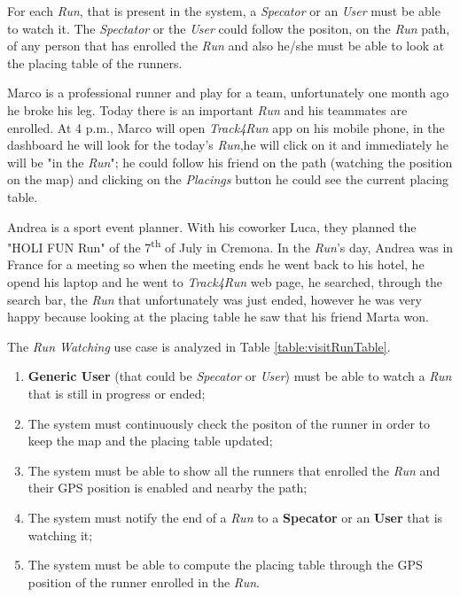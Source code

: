 For each \textit{Run}, that is present in the system, a \textit{Specator} or an \textit{User} must be able to watch it.
The \textit{Spectator} or the \textit{User} could follow the positon, on the \textit{Run} path, of any person that has enrolled the \textit{Run} and also he/she must be able to look at the placing table of the runners.

Marco is a professional runner and play for a team, unfortunately one month ago he broke his leg. Today there is an important \textit{Run} and his teammates are enrolled. At 4 p.m., Marco will open \textit{Track4Run} app on his mobile phone, in the dashboard he will look for the today's \textit{Run},he will click on it and immediately he will be "in the \textit{Run}";
he could follow his friend on the path (watching the position on the map) and clicking on the \textit{Placings} button he could see the current placing table.

Andrea is a sport event planner. With his coworker Luca, they planned the "HOLI FUN Run" of the 7\textsuperscript{th} of July in Cremona. In the \textit{Run}'s day, Andrea was in France for a meeting so when the meeting ends he went back to his hotel, he opend his laptop and he went to \textit{Track4Run} web page, he searched, through the search bar, the \textit{Run} that unfortunately was just ended, however he was very happy because looking at the placing table he saw that his friend Marta won.

The \textit{Run Watching} use case is analyzed in Table \ref{table:visitRunTable}.

\begin{enumerate}
  \item \textbf{Generic User} (that could be \textit{Specator} or \textit{User}) must be able to watch a \textit{Run} that is still in progress or ended;
  \item The system must continuously check the positon of the runner in order to keep the map and the placing table updated;
  \item The system must be able to show all the runners that enrolled the \textit{Run} and their GPS position is enabled and nearby the path;
  \item The system must notify the end of a \textit{Run} to a \textbf{Specator} or an \textbf{User} that is watching it;
  \item The system must be able to compute the placing table through the GPS position of the runner enrolled in the \textit{Run}.
\end{enumerate}


